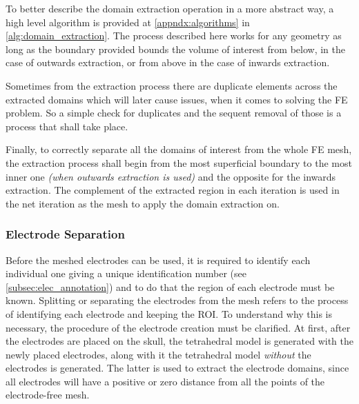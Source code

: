 To better describe the domain extraction operation in a more abstract way, a high level algorithm is provided at \autoref{appndx:algorithms} in \autoref{alg:domain_extraction}. The process described here works for any geometry as long as the boundary provided bounds the volume of interest from below, in the case of outwards extraction, or from above in the case of inwards extraction.

Sometimes from the extraction process there are duplicate elements across the extracted domains which will later cause issues, when it comes to solving the \gls{FE} problem. So a simple check for duplicates and the sequent removal of those is a process that shall take place.

Finally, to correctly separate all the domains of interest from the whole \gls{FE} mesh, the extraction process shall begin from the most superficial boundary to the most inner one \textit{(when outwards extraction is used)} and the opposite for the inwards extraction. The complement of the extracted region in each iteration is used in the net iteration as the mesh to apply the domain extraction on.

\subsubsection{Electrode Separation}
\label{subsec:elec_separation}

Before the meshed electrodes can be used, it is required to identify each individual one giving a unique identification number (see \ref{subsec:elec_annotation}) and to do that the region of each electrode must be known. Splitting or separating the electrodes from the mesh refers to the process of identifying each electrode and keeping the \gls{ROI}. To understand why this is necessary, the procedure of the electrode creation must be clarified. At first, after the electrodes are placed on the skull, the tetrahedral model is generated with the newly placed electrodes, along with it the tetrahedral model \textit{without} the electrodes is generated. The latter is used to extract the electrode domains, since all electrodes will have a positive or zero distance from all the points of the electrode-free mesh.

